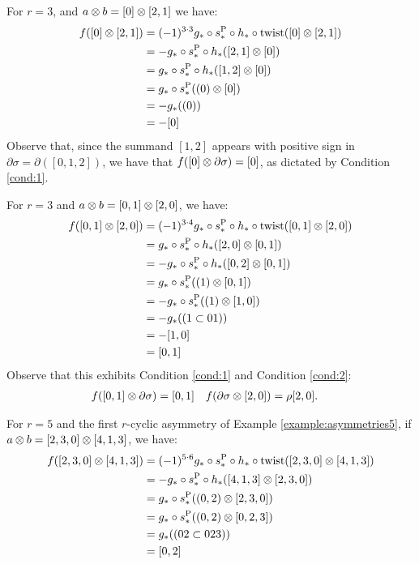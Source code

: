 \begin{example}\label{example:f3_1}
	For $r=3$, and $a \otimes b = [0] \otimes [2,1]$ we have:
	\begin{align*}
		f([0] \otimes [2,1])
		&= (-1)^{3\cdot 3}g_*\circ s_*^{\operatorname{P}}\circ h_*\circ \operatorname{twist}([0] \otimes [2,1])
		\\
		&= -g_*\circ s_*^{\operatorname{P}}\circ h_*([2,1] \otimes [0])
		\\
		&= g_*\circ s_*^{\operatorname{P}}\circ h_*([1,2] \otimes [0])
		\\
		&= g_*\circ s_*^{\operatorname{P}}((0) \otimes [0])
		\\
		&= -g_*((0))
		\\
		&= -[0]
	\end{align*}
	Observe that, since the summand $[1,2]$ appears with positive sign in $\partial \sigma = \partial([0,1,2])$, we have that $f([0] \otimes \partial\sigma) = [0]$, as dictated by Condition \eqref{cond:1}.
\end{example}

\begin{example}\label{example:f3_2}
	For $r=3$ and $a \otimes b = [0,1] \otimes [2,0]$, we have:
	\begin{align*}
		f([0,1] \otimes [2,0]) &= (-1)^{3\cdot 4}g_*\circ s_*^{\operatorname{P}}\circ h_*\circ \operatorname{twist}([0,1] \otimes [2,0])
		\\
		&= g_*\circ s_*^{\operatorname{P}}\circ h_*([2,0] \otimes [0,1])
		\\
		&= -g_*\circ s_*^{\operatorname{P}}\circ h_*([0,2] \otimes [0,1])
		\\
		&= g_*\circ s_*^{\operatorname{P}}((1) \otimes [0,1])
		\\
		&= -g_*\circ s_*^{\operatorname{P}}((1) \otimes [1,0])
		\\
		&= -g_*((1 \subset 01))
		\\
		&= -[1,0]
		\\
		&= [0,1]
	\end{align*}
	Observe that this exhibits Condition \eqref{cond:1} and Condition \eqref{cond:2}:
	\begin{align*}
		f([0,1] \otimes \partial\sigma) &= [0,1]
		&
		f(\partial\sigma \otimes [2,0]) &= \rho[2,0].
	\end{align*}
\end{example}

\begin{example}\label{example:f5_1}
	For $r=5$ and the first $r$-cyclic asymmetry of Example \ref{example:asymmetries5}, if $a \otimes b = [2,3,0] \otimes [4,1,3]$, we have:
	\begin{align*}
		f([2,3,0] \otimes [4,1,3]) &= (-1)^{5\cdot 6}g_*\circ s_*^{\operatorname{P}}\circ h_*\circ \operatorname{twist}([2,3,0] \otimes [4,1,3])
		\\
		&= -g_*\circ s_*^{\operatorname{P}}\circ h_*([4,1,3] \otimes [2,3,0])
		\\
		&= g_*\circ s_*^{\operatorname{P}}((0,2) \otimes [2,3,0])
		\\
		&= g_*\circ s_*^{\operatorname{P}}((0,2) \otimes [0,2,3])
		\\
		&= g_*((02 \subset 023))
		\\
		&= [0,2]
	\end{align*}
\end{example}

